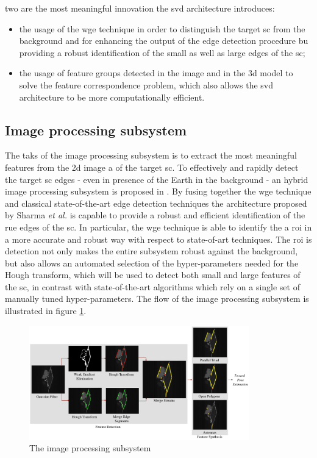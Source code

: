 two are the most meaningful innovation the \acrshort{svd} architecture introduces:
\begin{itemize}
  \item the usage of the \acrshort{wge} technique in order to distinguish the target \acrshort{sc} from the background and for enhancing the output of the edge detection procedure bu providing a robust identification of the small as well as large edges of the \acrshort{sc};
  \item the usage of feature groups detected in the image and in the \acrshort{3d} model to solve the feature correspondence problem, which also allows the \acrshort{svd} architecture to be more computationally efficient.
\end{itemize}

\subsection{Image processing subsystem}
The taks of the image processing subsystem is to extract the most meaningful features from the \acrshort{2d} image a of the target \acrshort{sc}. To effectively and rapidly detect the target \acrshort{sc} edges - even in presence of the Earth in the background - an hybrid image processing subsystem is proposed in \cite{Sharma2018}.
By fusing together the \acrshort{wge} technique and classical state-of-the-art edge detection techniques the architecture proposed by Sharma \textit{et al.} is capable to provide a robust and efficient identification of the rue edges of the \acrshort{sc}.
In particular, the \acrshort{wge} technique is able to identify the a \acrfull{roi} in a more accurate and robust way with respect to state-of-art techniques. The \acrshort{roi} is detection not only makes the entire subsystem robust against the background, but also allows an automated selection of the hyper-parameters needed for the Hough transform, which will be used to detect both small and large features of the \acrshort{sc}, in contrast with state-of-the-art algorithms which rely on a single set of manually tuned hyper-parameters.
The flow of the image processing subsystem is illustrated in figure \ref{fig:imageProcessingSubsystem}.

\begin{figure}[htbp]
  \centering
  \includegraphics[width=0.85\textwidth]{gfx/imageProcessingSubsystem.eps}
  \caption{The image processing subsystem \cite{Sharma2018}}
  \label{fig:imageProcessingSubsystem}
\end{figure}

